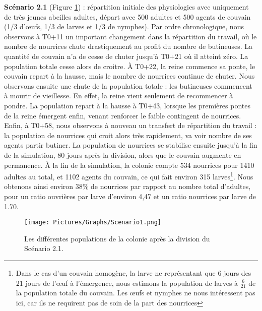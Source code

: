 		\textbf{Scénario 2.1} (Figure \ref{sc1}) : répartition initiale des physiologies avec uniquement de très jeunes abeilles adultes, départ avec 500 adultes et 500 agents de couvain (1/3 d'œufs, 1/3 de larves et 1/3 de nymphes). Par ordre chronologique, nous observons à T0+11 un important changement dans la répartition du travail, où le nombre de nourrices chute drastiquement au profit du nombre de butineuses. La quantité de couvain n'a de cesse de chuter jusqu'à T0+21 où il atteint zéro. La population totale cesse alors de croitre. À T0+22, la reine commence sa ponte, le couvain repart à la hausse, mais le nombre de nourrices continue de chuter. Nous observons ensuite une chute de la population totale : les butineuses commencent à mourir de vieillesse. En effet, la reine vient seulement de recommencer à pondre. La population repart à la hausse à T0+43, lorsque les premières pontes de la reine émergent enfin, venant renforcer le faible contingent de nourrices. Enfin, à T0+58, nous observons à nouveau un transfert de répartition du travail : la population de nourrices qui croit alors très rapidement, va voir nombre de ses agents partir butiner. La population de nourrices se stabilise ensuite jusqu'à la fin de la simulation, 80 jours après la division, alors que le couvain augmente en permanence. À la fin de la simulation, la colonie compte 534 nourrices pour 1410 adultes au total, et 1102 agents du couvain, ce qui fait environ 315 larves\footnote{\label{footCalculLarves} Dans le cas d'un couvain homogène, la larve ne représentant que 6 jours des 21 jours de l'œuf à l'émergence, nous estimons la population de larves à $\frac{6}{21}$ de la population totale du couvain. Les œufs et nymphes ne nous intéressent pas ici, car ils ne requirent pas de soin de la part des nourrices}. Nous obtenons ainsi environ 38\% de nourrices par rapport au nombre total d'adultes, pour un ratio ouvrières par larve d'environ 4,47 et un ratio nourrices par larve de 1.70.
	
	\begin{figure}
	\centering
	\texttt{[image: Pictures/Graphs/Scenario1.png]}
	\caption{Les différentes populations de la colonie après la division du Scénario 2.1.}
	\label{sc1}
	\end{figure}
		
